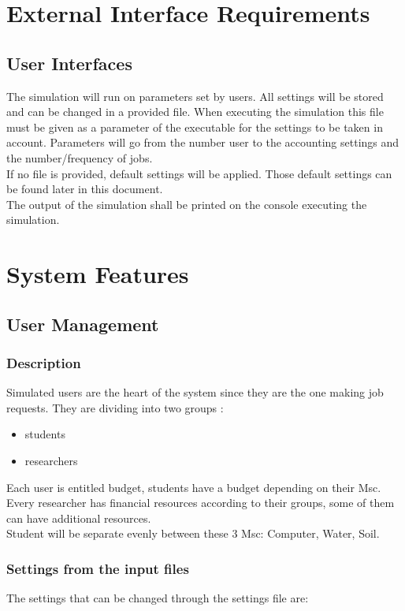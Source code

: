 \documentclass{scrreprt}
\begin{document}
\chapter{External Interface Requirements}

\section{User Interfaces}
The simulation will run on parameters set by users. All settings will be stored and can be changed in a provided file. When executing the simulation this file must be given as a parameter of the executable for the settings to be taken in account. Parameters will go from the number user to the accounting settings and the number/frequency of jobs.\\
If no file is provided, default settings will be applied. Those default settings can be found later in this document.\\
The output of the simulation shall be printed on the console executing the simulation.


\chapter{System Features}

\section{User Management}


\subsection{Description}
Simulated users are the heart of the system since they are the one making job requests. They are dividing into two groups :
\begin{itemize}
\item students
\item researchers
\end{itemize}
Each user is entitled budget, students have a budget depending on their Msc. Every researcher has financial resources according to their groups, some of them can have additional resources.\\
Student will be separate evenly between these 3 Msc: Computer, Water, Soil.

\subsection{Settings from the input files}
The settings that can be changed through the settings file are:
\end{document}
